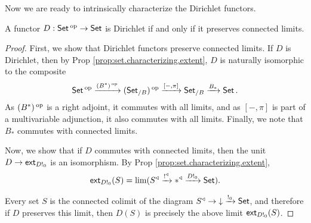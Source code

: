 Now we are ready to intrinsically characterize the Dirichlet functors.
\begin{thm}
A functor $D : \operatorname{\mathsf{{Set}}}\operatorname{^\textnormal{op}} \to \operatorname{\mathsf{{Set}}}$ is Dirichlet if and only if it preserves
connected limits. 
\end{thm}
\begin{proof}
First, we show that Dirichlet functors preserve connected limits. If $D$ is
Dirichlet, then by Prop \ref{prop:set.characterizing.extent}, $D$ is naturally
isomorphic to the composite
$$\operatorname{\mathsf{{Set}}}\operatorname{^\textnormal{op}} \xrightarrow{(B^{\ast})\operatorname{^\textnormal{op}}} (\operatorname{\mathsf{{Set}}}_{/B})\operatorname{^\textnormal{op}} \xrightarrow{[-, \pi]} \operatorname{\mathsf{{Set}}}_{/B}
\xrightarrow{B_\ast} \operatorname{\mathsf{{Set}}}.$$
As $(B^{\ast})\operatorname{^\textnormal{op}}$ is a right adjoint, it commutes with all limits, and as $[-,\pi]$
is part of a multivariable adjunction, it also commutes with all limits.
Finally, we note that $B_{\ast}$ commutes with connected limits.

Now, we show that if $D$ commutes with connected limits, then the unit
$D \to \operatorname{\mathsf{{ext}}}_{D!_0}$ is an isomorphism. By Prop
\ref{prop:set.characterizing.extent}, 
  $$\operatorname{\mathsf{{ext}}}_{D!_0}(S) = \lim(S^{\triangleleft} \xrightarrow{!^{\triangleleft}} \ast^{\triangleleft}
  \xrightarrow{D!_0} \operatorname{\mathsf{{Set}}}).$$
  
Every set $S$ is the connected colimit of the diagram $S^{\triangleleft} \to
\mathbin{\downarrow} \xrightarrow{!_0} \operatorname{\mathsf{{Set}}}$, and therefore if $D$ preserves this limit, then
$D(S)$ is precisely the above limit $\operatorname{\mathsf{{ext}}}_{D!_0}(S)$.
\end{proof}

